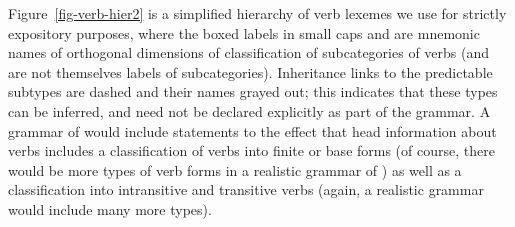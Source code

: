 \documentclass[output=paper
 	        ,biblatex
                ,babelshorthands
                ,newtxmath
                ,draftmode
                ,colorlinks, citecolor=brown
]{langscibook}
\begin{document}

Figure~\ref{fig-verb-hier2} is a simplified  hierarchy of verb lexemes we use for strictly expository purposes, where the boxed labels in small caps  and  are mnemonic names of orthogonal dimensions of classification  of subcategories of verbs (and are not themselves labels of subcategories). Inheritance links to the predictable subtypes are dashed and their names grayed out; this indicates that these types can be inferred, and need not be declared explicitly as part of the grammar. A grammar of  would include statements to the effect that head information about verbs includes a classification of verbs into finite or base forms (of course, there would be more types of verb forms in a realistic grammar of ) as well as a classification into intransitive and transitive verbs (again, a realistic grammar would include many more types).
\end{document}
